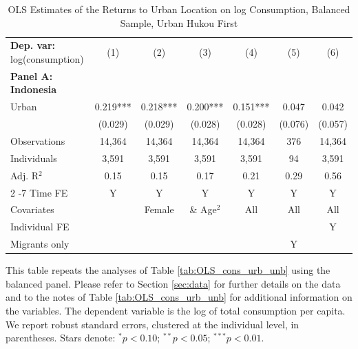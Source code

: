 \begin{table}[htbp] \centering \begin{threeparttable}
 \caption{OLS Estimates of the Returns to Urban Location on log Consumption, Balanced Sample, Urban Hukou First} 
 \label{tab:OLS_CHN_hukou_urban_first_consumption_urban_bal} 
\begin{tabular}{l cccccc} \toprule  \textbf{Dep. var:}  log(consumption) 
                    &\multicolumn{1}{c}{(1)}   &\multicolumn{1}{c}{(2)}   &\multicolumn{1}{c}{(3)}   &\multicolumn{1}{c}{(4)}   &\multicolumn{1}{c}{(5)}   &\multicolumn{1}{c}{(6)}   \\
\textbf{Panel A: Indonesia} \\
Urban               &       0.219***&       0.218***&       0.200***&       0.151***&       0.047   &       0.042   \\
                    &     (0.029)   &     (0.029)   &     (0.028)   &     (0.028)   &     (0.076)   &     (0.057)   \\
\addlinespace
Observations        &      14,364   &      14,364   &      14,364   &      14,364   &         376   &      14,364   \\
Individuals         &       3,591   &       3,591   &       3,591   &       3,591   &          94   &       3,591   \\
Adj. R$^{2}$        &        0.15   &        0.15   &        0.17   &        0.21   &        0.29   &        0.56   \\
\cmidrule{2 -7} Time FE & Y & Y & Y & Y & Y & Y \\ Covariates & & Female & \& Age$^2$ & All & All & All \\ Individual FE & & & & & & Y \\ Migrants only & & & & & Y & \\ \bottomrule \end{tabular} \begin{tablenotes}[flushleft] \footnotesize \item{This table repeats the analyses of Table \ref{tab:OLS_cons_urb_unb}  using the balanced panel. Please refer to Section \ref{sec:data} for further details on the data and to the notes of Table \ref{tab:OLS_cons_urb_unb} for additional information on the variables. The dependent variable is the log of total consumption per capita. We report robust standard errors, clustered at the individual level, in parentheses. Stars denote: $^{*} p<0.10$; $^{**} p<0.05$; $^{***} p<0.01$.} \end{tablenotes} \end{threeparttable} \end{table}
